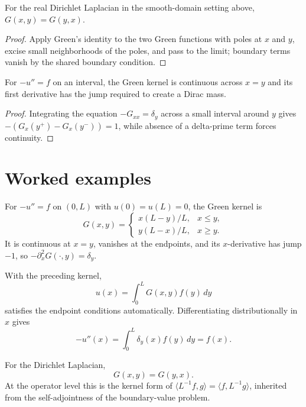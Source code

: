 \begin{theorem}\label{thm:iii25-02}
For the real Dirichlet Laplacian in the smooth-domain setting above, $G(x,y)=G(y,x)$.
\begin{proof}
Apply Green's identity to the two Green functions with poles at $x$ and $y$, excise small neighborhoods of the poles, and pass to the limit; boundary terms vanish by the shared boundary condition.
\end{proof}
\end{theorem}

\begin{theorem}\label{thm:iii25-03}
For $-u''=f$ on an interval, the Green kernel is continuous across $x=y$ and its first derivative has the jump required to create a Dirac mass.
\begin{proof}
Integrating the equation $-G_{xx}=\delta_y$ across a small interval around $y$ gives $-(G_x(y^+)-G_x(y^-))=1$, while absence of a delta-prime term forces continuity.
\end{proof}
\end{theorem}

\section{Worked examples}

\begin{example}\label{ex:iii25-worked-01}
For \(-u''=f\) on \((0,L)\) with \(u(0)=u(L)=0\), the Green kernel is
\[
G(x,y)=
\begin{cases}
x(L-y)/L,&x\le y,\\
y(L-x)/L,&x\ge y.
\end{cases}
\]
It is continuous at \(x=y\), vanishes at the endpoints, and its \(x\)-derivative
has jump \(-1\), so \(-\partial_x^2G(\cdot,y)=\delta_y\).
\end{example}

\begin{example}\label{ex:iii25-worked-02}
With the preceding kernel,
\[
u(x)=\int_0^LG(x,y)f(y)\,dy
\]
satisfies the endpoint conditions automatically. Differentiating
distributionally in \(x\) gives
\[
-u''(x)=\int_0^L\delta_y(x)f(y)\,dy=f(x).
\]
\end{example}

\begin{example}\label{ex:iii25-worked-03}
For the Dirichlet Laplacian,
\[
G(x,y)=G(y,x).
\]
At the operator level this is the kernel form of
\(\langle L^{-1}f,g\rangle=\langle f,L^{-1}g\rangle\), inherited from the
self-adjointness of the boundary-value problem.
\end{example}

